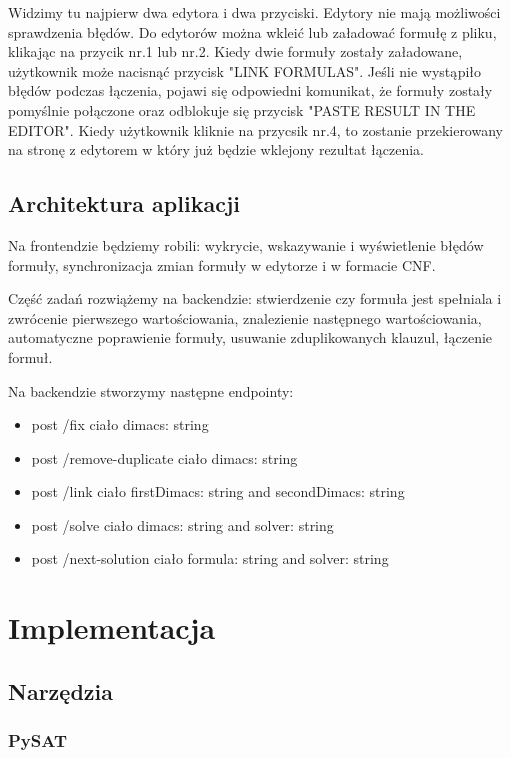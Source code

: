 \documentclass[a4paper,12pt,oneside]{book}
\theoremstyle{definition}
\begin{document}
\noindent Widzimy tu najpierw dwa edytora i dwa przyciski. Edytory nie mają możliwości sprawdzenia błędów. Do edytorów można wkleić lub załadować formułę z pliku, klikając na przycik nr.1 lub nr.2. Kiedy dwie formuły zostały załadowane, użytkownik może nacisnąć przycisk "LINK FORMULAS". Jeśli nie wystąpiło błędów podczas łączenia, pojawi się odpowiedni komunikat, że formuły zostały pomyślnie połączone oraz odblokuje się przycisk "PASTE RESULT IN THE EDITOR". Kiedy użytkownik kliknie na przycsik nr.4, to zostanie przekierowany na stronę z edytorem w który już będzie wklejony rezultat łączenia.

\section{Architektura aplikacji}

Na frontendzie będziemy robili: wykrycie, wskazywanie i wyświetlenie błędów formuły, synchronizacja zmian formuły w edytorze i w formacie CNF.

Część zadań rozwiążemy na backendzie: stwierdzenie czy formuła jest spełniala i zwrócenie pierwszego wartościowania, znalezienie następnego wartościowania, 
automatyczne poprawienie formuły, usuwanie zduplikowanych klauzul, łączenie formuł.

Na backendzie stworzymy następne endpointy:

\begin{itemize}
    \item post /fix ciało dimacs: string 
    \item post /remove-duplicate ciało dimacs: string
    \item post  /link  ciało firstDimacs: string and secondDimacs: string
    \item post /solve ciało dimacs: string and solver: string
    \item post /next-solution ciało formula: string and solver: string
\end{itemize}

\chapter{Implementacja}

\section{Narzędzia}

\subsection{PySAT}
\end{document}
